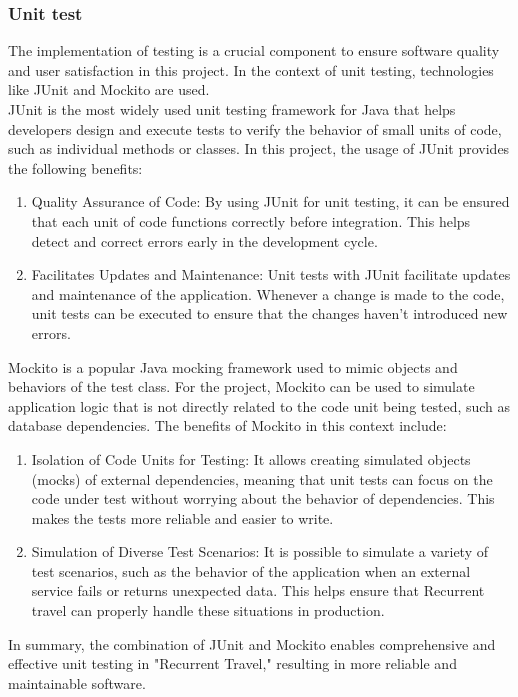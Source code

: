\documentclass[../memory.tex]{subfiles}
\begin{document}
\subsubsection{Unit test}
The implementation of testing is a crucial component to ensure software quality
and user satisfaction in this project. In the context of unit testing,
technologies like JUnit and Mockito are used.
\\[8pt]
JUnit is the most widely used unit testing framework for Java that helps
developers design and execute tests to verify the behavior of small units of
code, such as individual methods or classes. In this project, the usage of JUnit
provides the following benefits:
\begin{enumerate}[label = -]
	\item Quality Assurance of Code: By using JUnit for unit testing, it can be
	      ensured that each unit of code functions correctly before integration. This
	      helps detect and correct errors early in the development cycle.
	\item Facilitates Updates and Maintenance: Unit tests with JUnit facilitate
	      updates and maintenance of the application. Whenever a change is made to the
	      code, unit tests can be executed to ensure that the changes haven't
	      introduced new errors.
\end{enumerate}
Mockito is a popular Java mocking framework used to mimic objects and
behaviors of the test class. For the project, Mockito can be used to
simulate application logic that is not directly related to the code unit
being tested, such as database dependencies. The benefits of Mockito in this
context include:
\begin{enumerate}[label = -]
	\item Isolation of Code Units for Testing: It allows creating simulated
	      objects (mocks) of external dependencies, meaning that unit tests can focus
	      on the code under test without worrying about the behavior of dependencies.
	      This makes the tests more reliable and easier to write.
	\item Simulation of Diverse Test Scenarios: It is possible to simulate a
	      variety of test scenarios, such as the behavior of the application when an
	      external service fails or returns unexpected data. This helps ensure that
	      Recurrent travel can properly handle these situations in production.
\end{enumerate}
In summary, the combination of JUnit and Mockito enables comprehensive and
effective unit testing in "Recurrent Travel," resulting in more reliable and
maintainable software.
\end{document}
